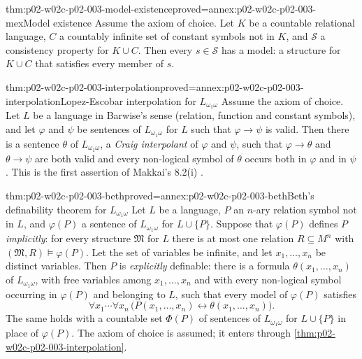\begin{hbtheorem}{thm:p02-w02c-p02-003-model-existence}{proved=annex:p02-w02c-p02-003-mex}{Model existence}
Assume the axiom of choice.  Let \(K\) be a countable relational language,
\(C\) a countably infinite set of constant symbols not in \(K\), and
\(\mathcal S\) a consistency property for \(K\cup C\).  Then every
\(s\in\mathcal S\) has a model: a structure for \(K\cup C\) that satisfies
every member of \(s\).
\end{hbtheorem}

\begin{hbtheorem}{thm:p02-w02c-p02-003-interpolation}{proved=annex:p02-w02c-p02-003-interpolation}{Lopez-Escobar interpolation for \(L_{\omega_1\omega}\)}
Assume the axiom of choice.  Let \(L\) be a language in Barwise's sense
(relation, function and constant symbols), and let \(\varphi\) and
\(\psi\) be sentences of \(L_{\omega_1\omega}\) for \(L\) such that
\(\varphi\to\psi\) is valid.  Then there is a sentence \(\theta\) of
\(L_{\omega_1\omega}\), a \emph{Craig interpolant} of \(\varphi\) and
\(\psi\), such that \(\varphi\to\theta\) and \(\theta\to\psi\) are both
valid and every non-logical symbol of \(\theta\) occurs both in
\(\varphi\) and in \(\psi\).  This is the first assertion of Makkai's
8.2(i) \cite[ch.~A.7, \S8, 8.2(i), p.~272]{Makkai1977}.
\end{hbtheorem}

\begin{hbtheorem}{thm:p02-w02c-p02-003-beth}{proved=annex:p02-w02c-p02-003-beth}{Beth's definability theorem for \(L_{\omega_1\omega}\)}
Let \(L\) be a language, \(P\) an \(n\)-ary relation symbol not in \(L\),
and \(\varphi(P)\) a sentence of \(L_{\omega_1\omega}\) for
\(L\cup\{P\}\).  Suppose that \(\varphi(P)\) defines \(P\)
\emph{implicitly}: for every structure \(\mathfrak M\) for \(L\) there is
at most one relation \(R\subseteq M^{n}\) with
\((\mathfrak M,R)\models\varphi(P)\).  Let the set of variables be
infinite, and let \(x_1,\ldots,x_n\) be distinct variables.  Then \(P\) is
\emph{explicitly} definable: there is a formula \(\theta(x_1,\ldots,x_n)\)
of \(L_{\omega_1\omega}\), with free variables among \(x_1,\ldots,x_n\) and
with every non-logical symbol occurring in \(\varphi(P)\) and belonging to
\(L\), such that every model of \(\varphi(P)\) satisfies
\[
 \forall x_1\cdots\forall x_n\,
 \bigl(P(x_1,\ldots,x_n)\leftrightarrow\theta(x_1,\ldots,x_n)\bigr).
\]
The same holds with a countable set \(\Phi(P)\) of sentences of
\(L_{\omega_1\omega}\) for \(L\cup\{P\}\) in place of \(\varphi(P)\).  The
axiom of choice is assumed; it enters through
\cref{thm:p02-w02c-p02-003-interpolation}.
\end{hbtheorem}

